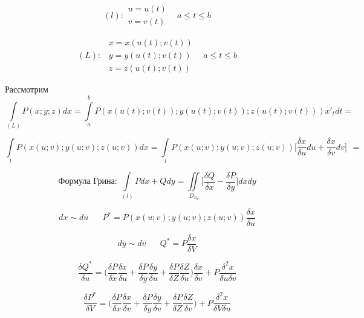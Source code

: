 \documentclass[12pt]{article}
\let\oldint\int
\let\oldiint\iint
\renewcommand{\int}{\oldint\limits}
\renewcommand{\iint}{\oldiint\limits}
\begin{document}
  \begin{adjustwidth}{1.5em}{1.5em}
    \begin{minipage}{0.5\textwidth}
      \[(l): \begin{matrix}
        u=u(t)\\
        v=v(t)
      \end{matrix} \hspace{10pt} a\leq t \leq b\]
    \end{minipage}
    \hspace{1em}
    \begin{minipage}{0.5\textwidth}
      \[(L):\hspace{5pt} \begin{matrix}
        x=x(u(t);v(t))\\
        y=y(u(t);v(t))\\
        z=z(u(t);v(t))
      \end{matrix}\hspace{10pt} a\leq t\leq b\]
    \end{minipage}
    \vspace{1em}
    \par
    Рассмотрим 
    \[\int_{(L)} P(x;y;z)dx=\int_{a}^{b}P(x(u(t);v(t));y(u(t);v(t));z(u(t);v(t)))x'_t dt=\]
   
    \[\int_{l} P(x(u;v);y(u;v);z(u;v))dx=\int_{l}P(x(u;v);y(u;v);z(u;v))\Big[\frac{\delta x}{\delta u}du + \frac{\delta x}{\delta v}dv\Big]\hspace{5pt} \boxed{=}\]
   
    \[\text{Формула Грина: } \int_{(l)}Pdx+Qdy=\iint_{D_{xy}}\Big[ \frac{\delta Q}{\delta x} -\frac{\delta P}{\delta y}\Big]dxdy\]
   
    \[dx \sim du \hspace{20pt} P^*=P(x(u;v);y (u;v);z (u;v))\frac{\delta x}{\delta u}\]
   
    \[dy \sim dv \hspace{20pt} Q^*=P \frac{\delta x}{\delta V}\]
    
    \[\frac{\delta Q^*}{\delta u}=
    \Big(\frac{\delta P}{\delta x}\frac{\delta x}{\delta u}+
    \frac{\delta P}{\delta y}\frac{\delta y}{\delta u}+
    \frac{\delta P}{\delta Z}\frac{\delta Z}{\delta u}\Big)
    \frac{\delta x}{\delta v}+P \frac{\delta^2 x}{\delta u \delta v}\]

    \[\frac{\delta P^*}{\delta V}=
    \Big(\frac{\delta P}{\delta x}\frac{\delta x}{\delta v}+
    \frac{\delta P}{\delta y}\frac{\delta y}{\delta v}+
    \frac{\delta P}{\delta Z}\frac{\delta Z}{\delta v}\Big)+
    P\frac{\delta^2 x}{\delta V \delta u}\]


\end{adjustwidth}
\end{document}
